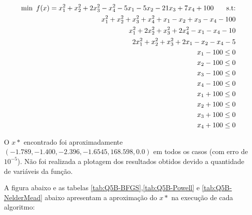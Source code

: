 \documentclass[a4paper, 12pt]{article}
\begin{document}
\begin{align*}
\begin{split}
\text{min\phantom{0}} f(x) = x_1^2 + x_2^2 + 2 x_3^2 - x_4^2 - 5 x_1 - 5 x_2 - 21 x_3 + 7 x_4 + 100  \text{\phantom{000} s.t:} \\
x_1^2 + x_2^2 + x_3^2 + x_4^2 + x_1 - x_2 + x_3 - x_4 - 100 \\
x_1^2 + 2 x_2^2 + x_3^2 + 2 x_4^2 - x_1 - x_4 - 10 \\
2 x_1^2 + x_2^2 + x_3^2 + 2 x_1 - x_2 - x_4 - 5 \\
x_1-100 \leq 0 \\
x_2-100 \leq 0 \\
x_3-100 \leq 0 \\
x_4-100 \leq 0 \\
x_1+100 \leq 0 \\
x_2+100 \leq 0 \\
x_3+100 \leq 0 \\
x_4+100 \leq 0 \\
\end{split}
\end{align*}

O $x*$ encontrado foi aproximadamente $(-1.789, -1.400, -2.396, -1.6545, 168.598, 0.0)$ em todos os casos (com erro de $10^{-5}$). Não foi realizada a plotagem dos resultados obtidos devido a quantidade de variáveis da função.


A figura abaixo e as tabelas \ref{tab:Q5B-BFGS},\ref{tab:Q5B-Powell} e \ref{tab:Q5B-NelderMead} abaixo apresentam a aproximação do $x*$ na execução de cada algoritmo:
\end{document}

